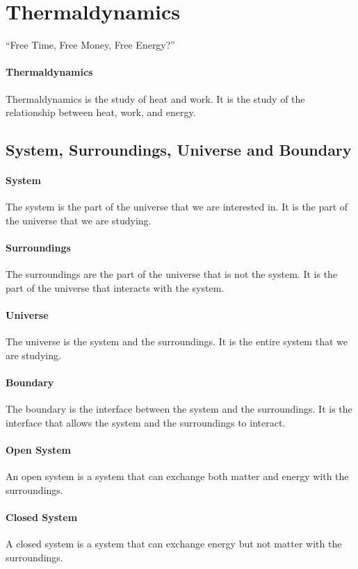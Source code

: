 \documentclass[11pt]{article}
\begin{document}
\section{Thermaldynamics}
\begin{center}
    ``Free Time, Free Money, Free Energy?''
\end{center}
\paragraph{Thermaldynamics} Thermaldynamics is the study of heat and work. It is the study of the relationship between heat, work, and energy.
\subsection{System, Surroundings, Universe and Boundary}
\paragraph{System} The system is the part of the universe that we are interested in. It is the part of the universe that we are studying.
\paragraph{Surroundings} The surroundings are the part of the universe that is not the system. It is the part of the universe that interacts with the system.   
\paragraph{Universe} The universe is the system and the surroundings. It is the entire system that we are studying.
\paragraph{Boundary} The boundary is the interface between the system and the surroundings. It is the interface that allows the system and the surroundings to interact.
\paragraph{Open System} An open system is a system that can exchange both matter and energy with the surroundings.
\paragraph{Closed System} A closed system is a system that can exchange energy but not matter with the surroundings.
\end{document}
